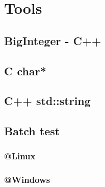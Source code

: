 \section{Tools}
	\subsection{BigInteger - C++}
		
	\subsection{C char*}
		
	\subsection{C++ std::string}
		
	\subsection{Batch test}
		\subsubsection{@Linux}
			
		\subsubsection{@Windows}
			

